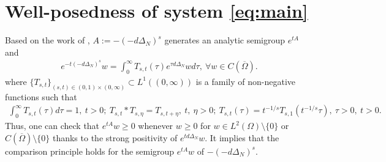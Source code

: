 \documentclass[a4paper,11pt]{amsart}
\theoremstyle{definition}
\def\O{\Omega}
\numberwithin{equation}{section}
\theoremstyle{definition}
\def\O{\Omega}
\begin{document}

%
%
%


%
%
%
%




\section{\bf Well-posedness of system \eqref{eq:main}}\label{section:3}
Based on the work of \cite[Section 2]{zhao_spatiotemporal_2023}, $A:=-(-d\Delta_N)^s$ generates an analytic semigroup $e^{tA}$ and 
\begin{align}\label{eq:frac}
e^{-t(-d\Delta_N)^s}w=\int_0^{\infty}T_{s,t}(\tau)e^{\tau d\Delta_N}wd\tau,~\forall w \in C(\overline{\O}).
\end{align}
where $\{T_{s,t}\}_{(s,t)\in (0,1)\times (0,\infty)}\subset L^1((0,\infty))$ is a family of non-negative functions such that
\begin{align*}
\int_0^{\infty}T_{s,t}(\tau)d\tau=1,~t>0;~T_{s,t}* T_{s,\eta}=T_{s,t+\eta},~t,~\eta>0;~T_{s,t}(\tau)=t^{-1/s}T_{s,1}\left(t^{-1/s}\tau\right),~\tau>0,~t>0.
\end{align*}
Thus, one can check that $e^{tA}w\geq 0$ whenever $w\geq 0$ for $w\in L^2(\O)\setminus\{0\}$ or $C(\overline{\O})\setminus\{0\}$ thanks to the strong positivity of $e^{td\Delta_N}w$. It implies that the comparison principle holds for the semigroup $e^{tA}w$ of $-(-d\Delta_N)^s$.
\end{document}
